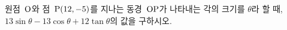 원점~$\mathrm{O}$와 점~$\mathrm{P}(12{,}\mkern3mu\mathopen{}-5)$를 지나는 동경~$\mathrm{OP}$가 나타내는 각의 크기를 $\theta$라 할 때, $13\sin\theta-13\cos\theta+12\tan\theta$의 값을 구하시오.

